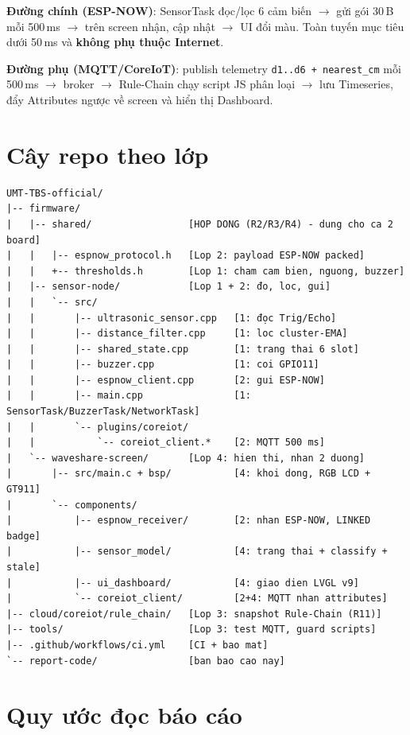 \textbf{Đường chính (ESP-NOW)}: SensorTask đọc/lọc 6 cảm biến $\rightarrow$
 gửi gói 30\,B mỗi 500\,ms $\rightarrow$
 trên screen nhận, cập nhật 
$\rightarrow$ UI đổi màu. Toàn tuyến mục tiêu dưới 50\,ms và \textbf{không phụ
thuộc Internet}.

\textbf{Đường phụ (MQTT/CoreIoT)}:  publish telemetry
\texttt{d1..d6 + nearest\_cm} mỗi 500\,ms $\rightarrow$ broker
 $\rightarrow$ Rule-Chain chạy script JS phân loại
 $\rightarrow$ lưu Timeseries, đẩy Attributes ngược về
screen và hiển thị Dashboard.

\section{Cây repo theo lớp}

\begin{verbatim}
UMT-TBS-official/
|-- firmware/
|   |-- shared/                 [HOP DONG (R2/R3/R4) - dung cho ca 2 board]
|   |   |-- espnow_protocol.h   [Lop 2: payload ESP-NOW packed]
|   |   +-- thresholds.h        [Lop 1: cham cam bien, nguong, buzzer]
|   |-- sensor-node/            [Lop 1 + 2: đo, loc, gui]
|   |   `-- src/
|   |       |-- ultrasonic_sensor.cpp   [1: đọc Trig/Echo]
|   |       |-- distance_filter.cpp     [1: loc cluster-EMA]
|   |       |-- shared_state.cpp        [1: trang thai 6 slot]
|   |       |-- buzzer.cpp              [1: coi GPIO11]
|   |       |-- espnow_client.cpp       [2: gui ESP-NOW]
|   |       |-- main.cpp                [1: SensorTask/BuzzerTask/NetworkTask]
|   |       `-- plugins/coreiot/
|   |           `-- coreiot_client.*    [2: MQTT 500 ms]
|   `-- waveshare-screen/       [Lop 4: hien thi, nhan 2 duong]
|       |-- src/main.c + bsp/           [4: khoi dong, RGB LCD + GT911]
|       `-- components/
|           |-- espnow_receiver/        [2: nhan ESP-NOW, LINKED badge]
|           |-- sensor_model/           [4: trang thai + classify + stale]
|           |-- ui_dashboard/           [4: giao dien LVGL v9]
|           `-- coreiot_client/         [2+4: MQTT nhan attributes]
|-- cloud/coreiot/rule_chain/   [Lop 3: snapshot Rule-Chain (R11)]
|-- tools/                      [Lop 3: test MQTT, guard scripts]
|-- .github/workflows/ci.yml    [CI + bao mat]
`-- report-code/                [ban bao cao nay]
\end{verbatim}

\section{Quy ước đọc báo cáo}

